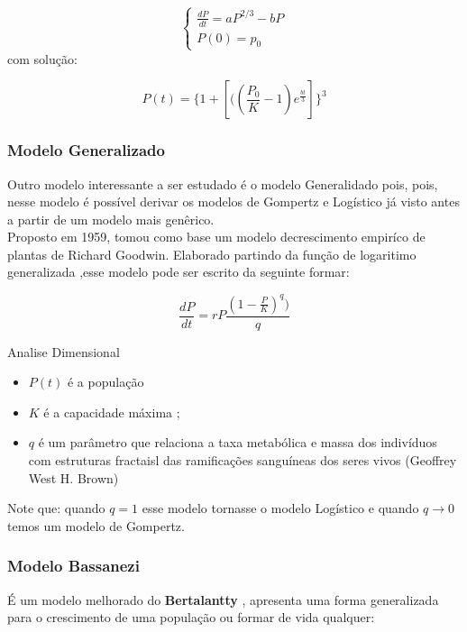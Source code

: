     \begin{equation*}
\begin{cases}
  \frac{dP}{dt} =aP^{2/3}- 
   bP\\
   P(0)=p_0  
\end{cases}
\end{equation*}
com solução:

\begin{equation*}
    P(t)=\{1+[((\frac{P_0}{K}
    -1)e^{\frac{bt}{3}}]\}^3
\end{equation*}

\newpage
\subsubsection{ Modelo Generalizado }

Outro modelo interessante a ser estudado é o modelo Generalidado pois, pois, nesse modelo é possível  derivar os modelos de Gompertz e Logístico já visto antes a partir de um modelo mais genêrico.\\  
Proposto em 1959, tomou como base um modelo decrescimento empiríco de plantas de Richard Goodwin. Elaborado partindo da função de logaritimo generalizada ,esse modelo pode ser escrito da seguinte formar:

\begin{equation*}
    \frac{dP}{dt} =rP
    \frac{(1-\frac{P}{K})^q)}{q}
\end{equation*}

Analise Dimensional
\begin{itemize}
    \item $P(t)$ é a população
    \item $K$ é a  capacidade máxima ;
    \item $q$ é um parâmetro que relaciona a taxa metabólica e massa dos indivíduos com estruturas fractaisl das ramificações sanguíneas dos seres vivos (Geoffrey West H. Brown)
\end{itemize}

Note que: quando $q = 1$ esse modelo tornasse o modelo Logístico e quando $q \to 0$ temos um modelo de Gompertz.

\subsubsection{ Modelo Bassanezi }

É um modelo melhorado do \textbf{Bertalantty} , apresenta uma forma generalizada para o crescimento de uma população ou formar de vida qualquer: 

